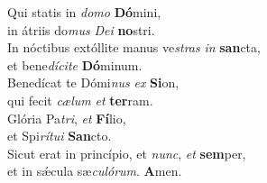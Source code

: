 \evenverse Qui statis in \textit{do}\textit{mo} \textbf{Dó}mini,~\*\\
\evenverse in átriis do\textit{mus} \textit{De}\textit{i} \textbf{no}stri.\\
\oddverse In nóctibus extóllite manus ve\textit{stras} \textit{in} \textbf{san}cta,~\*\\
\oddverse et bene\textit{dí}\textit{ci}\textit{te} \textbf{Dó}minum.\\
\evenverse Benedícat te Dómi\textit{nus} \textit{ex} \textbf{Si}on,~\*\\
\evenverse qui fecit \textit{cæ}\textit{lum} \textit{et} \textbf{ter}ram.\\
\oddverse Glória Pa\textit{tri}, \textit{et} \textbf{Fí}lio,~\*\\
\oddverse et Spi\textit{rí}\textit{tu}\textit{i} \textbf{San}cto.\\
\evenverse Sicut erat in princípio, et \textit{nunc}, \textit{et} \textbf{sem}per,~\*\\
\evenverse et in sǽcula sæ\textit{cu}\textit{ló}\textit{rum}. \textbf{A}men.\\
